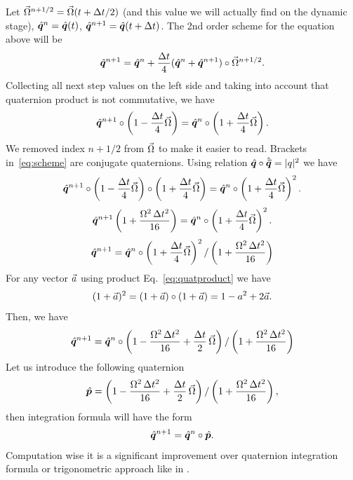 Let ${\vec{\Omega}}^{n+1/2} = {\vec{\Omega}}(t+\Delta t/2)$ (and this
value we will actually find on the dynamic stage),
${\hat{\bm{q}}}^{n}={\hat{\bm{q}}}(t)$,
${\hat{\bm{q}}}^{n+1}={\hat{\bm{q}}}(t+\Delta t)$. The 2nd order scheme for
the equation above will be
\begin{equation}
  {\hat{\bm{q}}}^{n+1} = {\hat{\bm{q}}}^n + \frac{\Delta t}{4} 
  ({\hat{\bm{q}}}^{n}+{\hat{\bm{q}}}^{n+1})\circ
  {\vec{\Omega}}^{n+1/2}.
\end{equation}
Collecting all next step values on the left side and taking into
account that quaternion product is not commutative, we have
\begin{equation}\label{eq:scheme}
  {\hat{\bm{q}}}^{n+1}\circ\left( 1 - \frac{\Delta t}{4}{\vec{\Omega}}\right) = 
  {\hat{\bm{q}}}^{n}\circ\left( 1 + \frac{\Delta t}{4}{\vec{\Omega}}\right).
\end{equation}
We removed index $n+1/2$ from ${\vec{\Omega}}$ to make it easier to
read. Brackets in~\eqref{eq:scheme} are conjugate
quaternions. Using relation ${\hat{\bm{q}}}\circ{\hat{\bm{\bar{q}}}} = |q|^2$ we have
\begin{equation}
  {\hat{\bm{q}}}^{n+1}\circ\left( 1 - \frac{\Delta
    t}{4}{\vec{\Omega}}\right)\circ\left( 1 + \frac{\Delta
    t}{4}{\vec{\Omega}}\right) = {\hat{\bm{q}}}^{n}\circ\left( 1 + \frac{\Delta
    t}{4}{\vec{\Omega}}\right)^2.
\end{equation}
\begin{equation}
  {\hat{\bm{q}}}^{n+1}\left( 1 +\frac{ \Omega^2\,\Delta
    t^2}{16}\right) = {\hat{\bm{q}}}^{n}\circ\left( 1 + \frac{\Delta
    t}{4}{\vec{\Omega}}\right)^2.
\end{equation}
\begin{equation}
  {\hat{\bm{q}}}^{n+1} = {\hat{\bm{q}}}^{n}\circ\left( 1 + \frac{\Delta
    t}{4}{\vec{\Omega}}\right)^2 / \left( 1 +\frac{ \Omega^2\,\Delta
    t^2}{16}\right)
\end{equation}
For any vector ${\vec{a}}$ using product Eq.~\eqref{eq:quatproduct} we
have
\begin{equation}
  (1+{\vec{a}})^2 = (1+{\vec{a}})\circ(1+{\vec{a}}) =
  1 - a^2 + 2{\vec{a}}.
\end{equation}
Then, we have
\begin{equation}
  {\hat{\bm{q}}}^{n+1} = {\hat{\bm{q}}}^{n} \circ \left(1 - \frac{\Omega^2\,\Delta t^2}{16} +
  \frac{\Delta t}{2}\,{\vec{\Omega}} \right) / \left( 1 +\frac{ \Omega^2\,\Delta
    t^2}{16}\right)
\end{equation}
Let us introduce the following quaternion
\begin{equation}
  {\hat{\bm{p}}} = \left(1 - \frac{\Omega^2\,\Delta t^2}{16} + \frac{\Delta
    t}{2}\,{\vec{\Omega}} \right) / \left( 1 +\frac{ \Omega^2\,\Delta
    t^2}{16}\right),
\end{equation}
then integration formula will have the form
\begin{equation}
  {\hat{\bm{q}}}^{n+1} = {\hat{\bm{q}}}^{n} \circ {\hat{\bm{p}}}.
\end{equation}
Computation wise it is a significant improvement over
\cite{bib:Walton-Braun-1993} quaternion integration formula or
trigonometric approach like in \cite{bib:gpugems3-harada-2008}.

